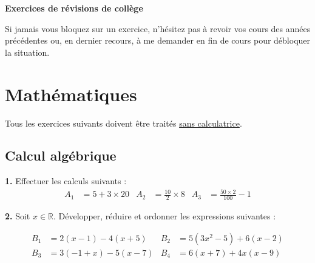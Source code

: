 \newpage

\enTete{\sndRevision}

\begin{center}
\begin{mdframed}[style=titr, leftmargin=60pt, rightmargin=60pt, innertopmargin=7pt, innerbottommargin=7pt, innerrightmargin=8pt, innerleftmargin=8pt]

\begin{center}
\large{\textbf{Exercices de révisions de collège}}
\end{center}

\end{mdframed}


\end{center}
Si jamais vous bloquez sur un exercice, n'hésitez pas à revoir vos cours des années précédentes ou, en dernier recours, à me demander en fin de cours pour débloquer la situation.

\renewcommand{\thesubsection}{\textcolor{red}{Exercice \arabic{subsection} :}}

\section{Mathématiques}
Tous les exercices suivants doivent être traités \underline{sans calculatrice}.
\subsection{Calcul algébrique}
\textbf{1.} Effectuer les calculs suivants :
\begin{align*}
    A_1 &= 5 + 3\times20 & A_2 &= \frac{10}{2}\times 8 & A_3 &= \frac{50\times2}{100}-1
\end{align*}
 
 \textbf{2.} Soit $x\in\mathbb{R}$. Développer, réduire et ordonner les expressions suivantes :

 \begin{align*}
B_1 & = 2(x-1)-4(x+5) & B_2 & = 5(3x^2-5)+6(x-2) \\
B_3 & = 3(-1+x)-5(x-7) & B_4 & = 6(x+7)+4x(x-9)  \\
\end{align*}

